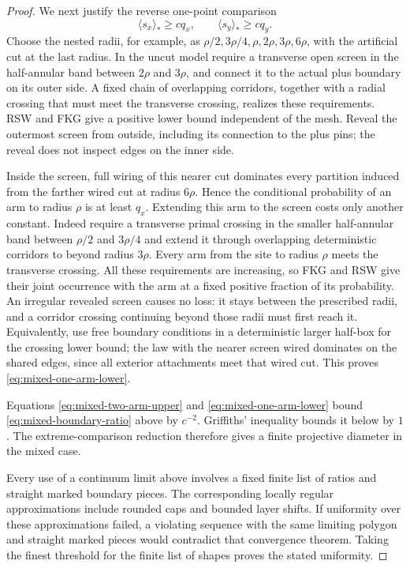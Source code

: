 \begin{proof}
We next justify the reverse one-point comparison
\begin{equation}
       \langle s_x\rangle_*\ge c q_x,
       \qquad \langle s_y\rangle_*\ge c q_y.
 \label{eq:mixed-one-arm-lower}
\end{equation}
Choose the nested radii, for example, as
$\rho/2,3\rho/4,\rho,2\rho,3\rho,6\rho$, with the artificial cut
at the last radius. In the uncut model require a transverse open
screen in the half-annular band between $2\rho$ and $3\rho$, and
connect it to the actual plus boundary on its outer side. A fixed
chain of overlapping corridors, together with a radial crossing that
must meet the transverse crossing, realizes these requirements.
RSW and FKG give a positive lower bound independent of the mesh.
Reveal the outermost screen from outside, including its connection
to the plus pins; the reveal does not inspect edges on the inner side.

Inside the screen, full wiring of this nearer cut dominates every
partition induced from the farther wired cut at radius $6\rho$.
Hence the conditional probability of an arm to radius $\rho$ is
at least $q_x$. Extending this arm to the screen costs only another
constant. Indeed require a transverse primal crossing in the smaller
half-annular band between $\rho/2$ and $3\rho/4$ and extend it through
overlapping deterministic corridors to beyond radius $3\rho$.
Every arm from the site to radius $\rho$ meets the transverse crossing.
All these requirements are increasing, so FKG and RSW give their
joint occurrence with the arm at a fixed positive fraction of its
probability. An irregular revealed screen causes no loss: it stays
between the prescribed radii, and a corridor crossing continuing
beyond those radii must first reach it. Equivalently, use free
boundary conditions in a deterministic larger half-box for the
crossing lower bound; the law with the nearer screen wired dominates
on the shared edges, since all exterior attachments meet that wired
cut. This proves \eqref{eq:mixed-one-arm-lower}.

Equations \eqref{eq:mixed-two-arm-upper} and
\eqref{eq:mixed-one-arm-lower} bound \eqref{eq:mixed-boundary-ratio}
above by $c^{-2}$. Griffiths' inequality bounds it below by $1$.
The extreme-comparison reduction therefore gives a finite projective
diameter in the mixed case.

Every use of a continuum limit above involves a fixed finite list of
ratios and straight marked boundary pieces. The corresponding locally
regular approximations include rounded caps and bounded layer shifts.
If uniformity over these approximations failed, a violating sequence
with the same limiting polygon and straight marked pieces would
contradict that convergence theorem. Taking the finest threshold for
the finite list of shapes proves the stated uniformity.
\end{proof}

